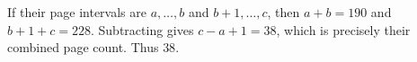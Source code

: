 If their page intervals are $a,\ldots,b$ and $b+1,\ldots,c$, then $a+b=190$ and $b+1+c=228$. Subtracting gives $c-a+1=38$, which is precisely their combined page count. Thus $\boxed{38}$.
